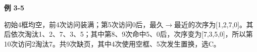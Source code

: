 {\color{ink}\bfseries 例 3-5}\par\vspace{1bp}初始4框均空，前4次访问装满；第5次访问0后，最久\(\to \)最近的次序为[1,\allowbreak{}2,\allowbreak{}7,\allowbreak{}0]。其后依次淘汰1、2、7、3、5；其中第8、9次命中5、0后，次序变为[7,\allowbreak{}3,\allowbreak{}5,\allowbreak{}0]，所以第10次访问2淘汰7。共9次缺页，其中4次使用空框、5次发生置换，选C。
